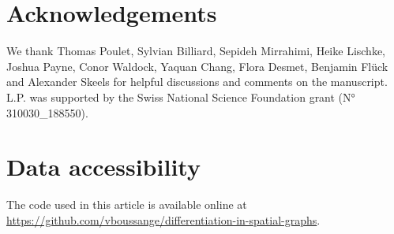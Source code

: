   \section{Acknowledgements}
  We thank Thomas Poulet, Sylvian Billiard, Sepideh Mirrahimi, Heike Lischke, Joshua Payne, Conor Waldock, Yaquan Chang, Flora Desmet, Benjamin Flück and Alexander Skeels for helpful discussions and comments on the manuscript. L.P. was supported by the Swiss National Science Foundation grant (N° 310030\_188550).
  
  \section{Data accessibility}
  The code used in this article is available online at \href{https://github.com/vboussange/differentiation-in-spatial-graphs}{https://github.com/vboussange/differentiation-in-spatial-graphs}.
  
  
  \printbibliography[heading=subbibliography]